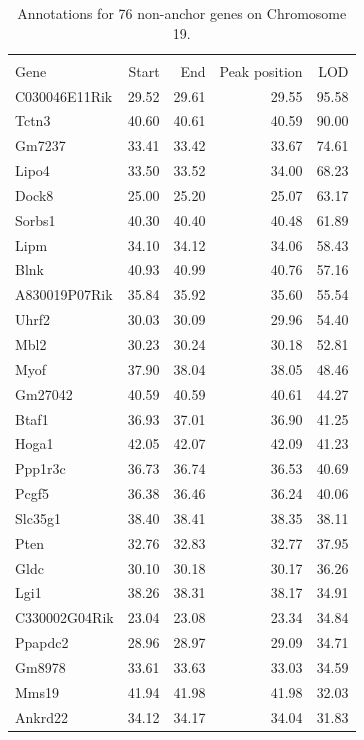 \documentclass[oneside]{book}\usepackage[]{graphicx}\usepackage[]{color}
\begin{document}
\begin{appendices}
{\begin{longtable}{lrr}
\end{longtable}
}
{\small
\begin{longtable}{lrrrr}
\caption{Annotations for 76 non-anchor genes on Chromosome 19.}\label{tab:ann76}\\
\hline \\
Gene & Start & End & Peak position & LOD \\
  \hline
C030046E11Rik & 29.52 & 29.61 & 29.55 & 95.58 \\
  Tctn3 & 40.60 & 40.61 & 40.59 & 90.00 \\
  Gm7237 & 33.41 & 33.42 & 33.67 & 74.61 \\
  Lipo4 & 33.50 & 33.52 & 34.00 & 68.23 \\
  Dock8 & 25.00 & 25.20 & 25.07 & 63.17 \\
  Sorbs1 & 40.30 & 40.40 & 40.48 & 61.89 \\
  Lipm & 34.10 & 34.12 & 34.06 & 58.43 \\
  Blnk & 40.93 & 40.99 & 40.76 & 57.16 \\
  A830019P07Rik & 35.84 & 35.92 & 35.60 & 55.54 \\
  Uhrf2 & 30.03 & 30.09 & 29.96 & 54.40 \\
  Mbl2 & 30.23 & 30.24 & 30.18 & 52.81 \\
  Myof & 37.90 & 38.04 & 38.05 & 48.46 \\
  Gm27042 & 40.59 & 40.59 & 40.61 & 44.27 \\
  Btaf1 & 36.93 & 37.01 & 36.90 & 41.25 \\
  Hoga1 & 42.05 & 42.07 & 42.09 & 41.23 \\
  Ppp1r3c & 36.73 & 36.74 & 36.53 & 40.69 \\
  Pcgf5 & 36.38 & 36.46 & 36.24 & 40.06 \\
  Slc35g1 & 38.40 & 38.41 & 38.35 & 38.11 \\
  Pten & 32.76 & 32.83 & 32.77 & 37.95 \\
  Gldc & 30.10 & 30.18 & 30.17 & 36.26 \\
  Lgi1 & 38.26 & 38.31 & 38.17 & 34.91 \\
  C330002G04Rik & 23.04 & 23.08 & 23.34 & 34.84 \\
  Ppapdc2 & 28.96 & 28.97 & 29.09 & 34.71 \\
  Gm8978 & 33.61 & 33.63 & 33.03 & 34.59 \\
  Mms19 & 41.94 & 41.98 & 41.98 & 32.03 \\
  Ankrd22 & 34.12 & 34.17 & 34.04 & 31.83 \\

\end{longtable}}
\end{appendices}
\end{document}
